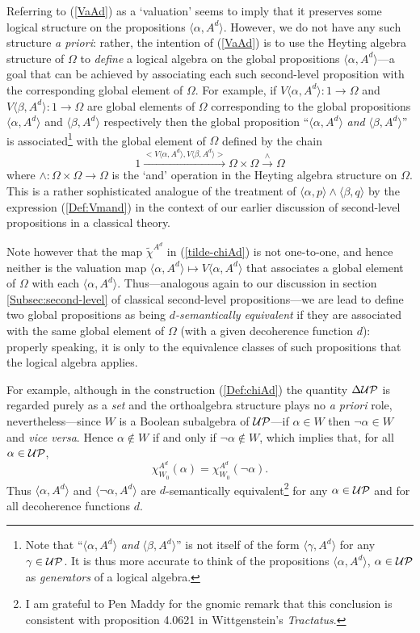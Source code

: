 \documentclass[12pt]{article}
\newcounter{def-number}[section]
\newcommand{\beq}{\begin{equation}}
\newcommand{\eeq}{\end{equation}}
\newcommand{\eq}[1]{(\ref{#1})}
\renewcommand{\a}{\alpha}                   %
\renewcommand{\b}{\beta}                    %
\newcommand{\g}{\gamma}
\newcommand{\gp}[2]{\langle#1,#2\rangle}
\newcommand{\map}{\rightarrow}
\newcommand{\Om}{\Omega}
\newcommand{\UP}{{\cal UP}}
\begin{document}
	Referring to \eq{VaAd} as a `valuation' seems to imply that it
preserves some logical structure on the propositions $\gp{\a}{A^d}$.
However, we do not have any such structure {\em a priori\/}:
rather, the intention of \eq{VaAd} is to use the Heyting algebra
structure of $\Om$ to {\em define\/} a logical algebra on the global
propositions $\gp{\a}{A^d}$---a goal that can be achieved by
associating each such second-level proposition with the
corresponding global element of $\Om$. For example, if
$V\gp{\a}{A^d}:1\map\Om$ and $V\gp{\b}{A^d}:1\map\Om$ are global
elements of $\Om$ corresponding to the global propositions
$\gp{\a}{A^d}$ and $\gp{\b}{A^d}$ respectively then the global
proposition ``$\gp{\a}{A^d}$ {\em and\/} $\gp{\b}{A^d}$'' is
associated\footnote{Note that ``$\gp{\a}{A^d}$ {\em and\/}
$\gp{\b}{A^d}$'' is not itself of the form $\gp{\g}{A^d}$ for any
$\g\in\UP$. It is thus more accurate to think of the propositions
$\gp{\a}{A^d}$, $\a\in\UP$ as {\em generators\/} of a logical
algebra.} with the global element of $\Om$ defined by the chain
\beq
1\stackrel{<V\gp{\a}{A^d},V\gp{\b}{A^d}>}{\longrightarrow}\Om\times\Om
\stackrel{\land}{\longrightarrow}\Om
\eeq 
where $\land:\Om\times\Om\map\Om$ is the `and' operation in the
Heyting algebra structure on $\Om$. This is a rather sophisticated
analogue of the treatment of $\gp{\a}{p}\land\gp{\b}{q}$ by the
expression \eq{Def:Vmand} in the context of our earlier discussion
of second-level propositions in a classical theory.

	Note however that the map $\tilde\chi^{A^d}$ in
\eq{tilde-chiAd} is not one-to-one, and hence neither is the
valuation map $\gp{\a}{A^d}\mapsto V\gp{\a}{A^d}$ that associates a
global element of $\Om$ with each $\gp{\a}{A^d}$.  Thus---analogous
again to our discussion in section \ref{Subsec:second-level} of
classical second-level propositions---we are lead to define two
global propositions as being {\em $d$-semantically equivalent\/} if
they are associated with the same global element of $\Om$ (with a
given decoherence function $d$): properly speaking, it is only to
the equivalence classes of such propositions that the logical
algebra applies.

	For example, although in the construction \eq{Def:chiAd} the
quantity $\Delta\UP$ is regarded purely as a {\em set\/} and the
orthoalgebra structure plays no {\em a priori\/} role,
nevertheless---since $W$ is a Boolean subalgebra of $\UP$---if
$\a\in W$ then $\neg\a\in W$ and {\em vice versa\/}. Hence
$\a\not\in W$ if and only if $\neg\a\not\in W$, which implies that,
for all $\a\in\UP$,
\beq
		\chi^{A^d}_{W_0}(\a)=\chi^{A^d}_{W_0}(\neg\a).
						\label{chiA(a)=chiA(nega)}
\eeq
Thus $\gp{\a}{A^d}$ and $\gp{\neg\a}{A^d}$ are $d$-semantically
equivalent\footnote{I am grateful to Pen Maddy for the gnomic remark
that this conclusion is consistent with proposition 4.0621 in
Wittgenstein's {\em Tractatus\/}.} for any $\a\in\UP$
and for all decoherence functions $d$.
\end{document}
